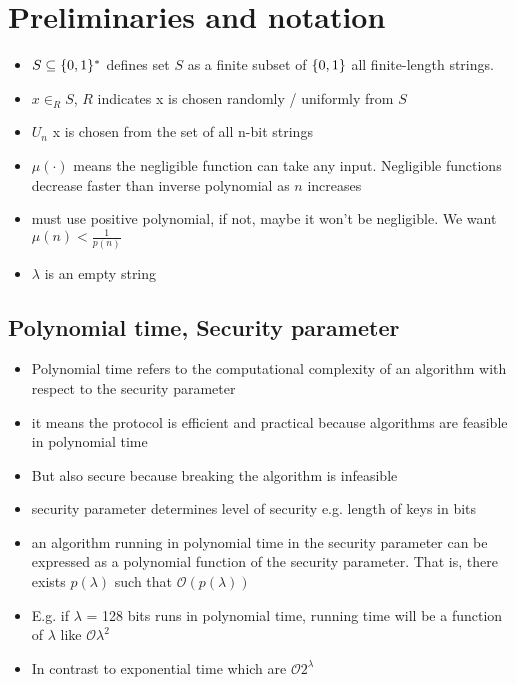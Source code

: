\section*{Preliminaries and notation}
\begin{itemize}
    \item $S \subseteq \{0,1\}^*$ defines set $S$ as a finite subset of $\{0,1\}$ all finite-length strings. 
    \item $x \in_R S$, $R$ indicates x is chosen randomly / uniformly from $S$
    \item $U_n$ x is chosen from the set of all n-bit strings
    \item $\mu(\cdot)$ means the negligible function can take any input. Negligible functions decrease faster than inverse polynomial as $n$ increases
    \item must use positive polynomial, if not, maybe it won't be negligible. We want $\mu(n) < \frac{1}{p(n)}$
    \item $\lambda$ is an empty string
\end{itemize}

\subsection*{Polynomial time, Security parameter}
\begin{itemize}
    \item Polynomial time refers to the computational complexity of an algorithm with respect to the security parameter
    \item it means the protocol is efficient and practical because algorithms are feasible in polynomial time
    \item But also secure because breaking the algorithm is infeasible
    \item security parameter determines level of security e.g. length of keys in bits
    \item an algorithm running in polynomial time in the security parameter can be expressed as a polynomial function of the security parameter. That is, there exists $ p(\lambda)$ such that $\mathcal{O}(p(\lambda))$
    \item E.g. if $\lambda$ = 128 bits runs in polynomial time, running time will be a function of $\lambda$ like $\mathcal{O}\lambda^2$
    \item In contrast to exponential time which are $\mathcal{O}2^{\lambda}$
\end{itemize}

